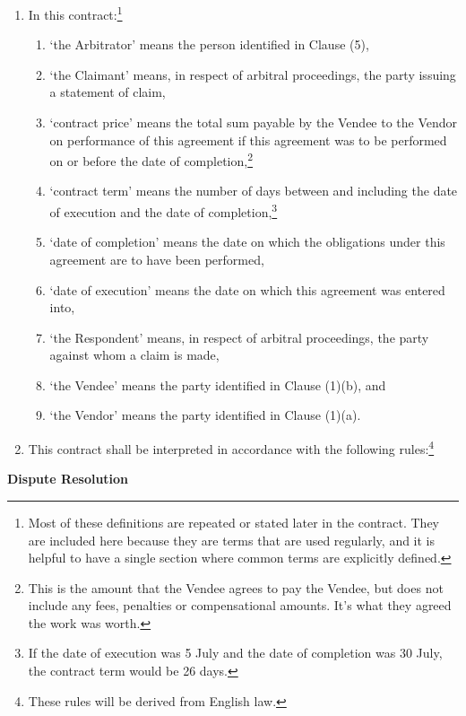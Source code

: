 \documentclass[a4paper,12pt]{article}
\begin{document}
\begin{enumerate}[resume]
	\item In this contract:\footnote{Most of these definitions are repeated or stated later in the contract. They are included here because they are terms that are used regularly, and it is helpful to have a single section where common terms are explicitly defined.}
	\begin{enumerate}
		\item `the Arbitrator' means the person identified in Clause (5),
		\item `the Claimant' means, in respect of arbitral proceedings, the party issuing a statement of claim,
		\item `contract price' means the total sum payable by the Vendee to the Vendor on performance of this agreement if this agreement was to be performed on or before the date of completion,\footnote{This is the amount that the Vendee agrees to pay the Vendee, but does not include any fees, penalties or compensational amounts. It's what they agreed the work was worth.}
		\item `contract term' means the number of days between and including the date of execution and the date of completion,\footnote{If the date of execution was 5 July and the date of completion was 30 July, the contract term would be 26 days.}
		\item `date of completion' means the date on which the obligations under this agreement are to have been performed,
		\item `date of execution' means the date on which this agreement was entered into,
		\item `the Respondent' means, in respect of arbitral proceedings, the party against whom a claim is made,
		\item `the Vendee' means the party identified in Clause (1)(b), and
		\item `the Vendor' means the party identified in Clause (1)(a).
	\end{enumerate}
	\item This contract shall be interpreted in accordance with the following rules:\footnote{These rules will be derived from English law.}
\end{enumerate}

\textbf{Dispute Resolution}
\end{document}
